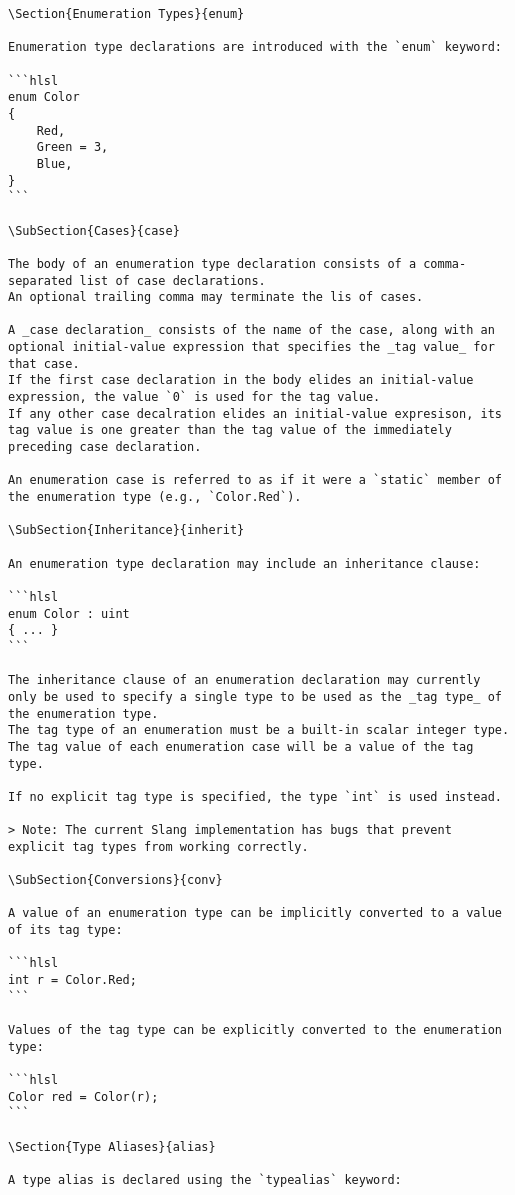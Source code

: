 \begin{verbatim}
\Section{Enumeration Types}{enum}

Enumeration type declarations are introduced with the `enum` keyword:

```hlsl
enum Color
{
    Red,
    Green = 3,
    Blue,
}
```

\SubSection{Cases}{case}

The body of an enumeration type declaration consists of a comma-separated list of case declarations.
An optional trailing comma may terminate the lis of cases.

A _case declaration_ consists of the name of the case, along with an optional initial-value expression that specifies the _tag value_ for that case.
If the first case declaration in the body elides an initial-value expression, the value `0` is used for the tag value.
If any other case decalration elides an initial-value expresison, its tag value is one greater than the tag value of the immediately preceding case declaration.

An enumeration case is referred to as if it were a `static` member of the enumeration type (e.g., `Color.Red`).

\SubSection{Inheritance}{inherit}

An enumeration type declaration may include an inheritance clause:

```hlsl
enum Color : uint
{ ... }
```

The inheritance clause of an enumeration declaration may currently only be used to specify a single type to be used as the _tag type_ of the enumeration type.
The tag type of an enumeration must be a built-in scalar integer type.
The tag value of each enumeration case will be a value of the tag type.

If no explicit tag type is specified, the type `int` is used instead.

> Note: The current Slang implementation has bugs that prevent explicit tag types from working correctly.

\SubSection{Conversions}{conv}

A value of an enumeration type can be implicitly converted to a value of its tag type:

```hlsl
int r = Color.Red;
```

Values of the tag type can be explicitly converted to the enumeration type:

```hlsl
Color red = Color(r);
```

\Section{Type Aliases}{alias}

A type alias is declared using the `typealias` keyword:


\end{verbatim}
